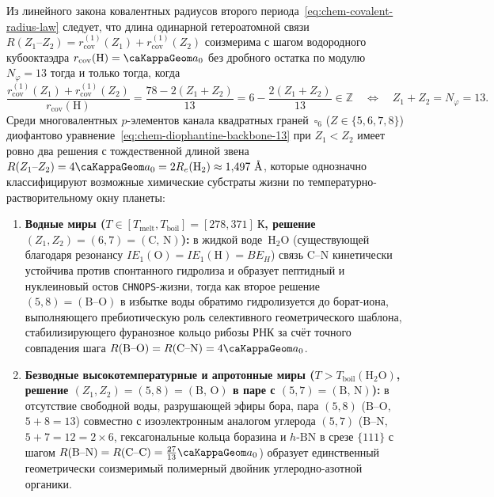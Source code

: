 \begin{corollary}[Диофантов отбор соизмеримых полимерных хребтов ($Z_1 + Z_2 = N_\varphi = 13$) и два планетарных класса биосфер]
\label{cor:chem-diophantine-backbones-planets}
Из линейного закона ковалентных радиусов второго периода~\eqref{eq:chem-covalent-radius-law} следует, что длина одинарной гетероатомной связи $R(Z_1\text{--}Z_2) = r_{\mathrm{cov}}^{(1)}(Z_1) + r_{\mathrm{cov}}^{(1)}(Z_2)$ соизмерима с шагом водородного кубооктаэдра $r_{\mathrm{cov}}(\text{H}) = \caKappaGeom a_0$ без дробного остатка по модулю $N_\varphi = 13$ тогда и только тогда, когда
\begin{equation}
\label{eq:chem-diophantine-backbone-13}
  \frac{r_{\mathrm{cov}}^{(1)}(Z_1) + r_{\mathrm{cov}}^{(1)}(Z_2)}{r_{\mathrm{cov}}(\text{H})}
  = \frac{78 - 2(Z_1 + Z_2)}{13}
  = 6 - \frac{2(Z_1 + Z_2)}{13} \in \mathbb{Z}
  \quad\Longleftrightarrow\quad
  Z_1 + Z_2 = N_\varphi = 13.
\end{equation}
Среди многовалентных $p$-элементов канала квадратных граней~$\square_6$ ($Z\in\{5,6,7,8\}$) диофантово уравнение~\eqref{eq:chem-diophantine-backbone-13} при $Z_1 < Z_2$ имеет ровно два решения с тождественной длиной звена $R(Z_1\text{--}Z_2) = 4\caKappaGeom a_0 = 2R_e(\text{H}_2) \approx 1{,}497\ \text{\normalfont\AA}$, которые однозначно классифицируют возможные химические субстраты жизни по температурно-растворительному окну планеты:
\begin{enumerate}[leftmargin=*,noitemsep]
\item \textbf{Водные миры ($T \in [T_{\mathrm{melt}}, T_{\mathrm{boil}}] = [278, 371]\ \mathrm{К}$, решение $(Z_1, Z_2) = (6, 7) = (\text{C, N})$):}
  в жидкой воде~$\text{H}_2\text{O}$ (существующей благодаря резонансу $IE_1(\text{O}) = IE_1(\text{H}) = BE_H$) связь $\text{C--N}$ кинетически устойчива против спонтанного гидролиза и образует пептидный и нуклеиновый остов \texttt{CHNOPS}-жизни, тогда как второе решение $(5, 8) = (\text{B--O})$ в избытке воды обратимо гидролизуется до борат-иона, выполняющего пребиотическую роль селективного геометрического шаблона, стабилизирующего фуранозное кольцо рибозы РНК за счёт точного совпадения шага $R(\text{B--O}) = R(\text{C--N}) = 4\caKappaGeom a_0$.
\item \textbf{Безводные высокотемпературные и апротонные миры ($T > T_{\mathrm{boil}}(\text{H}_2\text{O})$, решение $(Z_1, Z_2) = (5, 8) = (\text{B, O})$ в паре с $(5, 7) = (\text{B, N})$):}
  в отсутствие свободной воды, разрушающей эфиры бора, пара $(5, 8)$ ($\text{B--O}$, $5+8=13$) совместно с изоэлектронным аналогом углерода $(5, 7)$ ($\text{B--N}$, $5+7=12=2\times 6$, гексагональные кольца боразина и $h\text{-BN}$ в срезе $\{111\}$ с шагом $R(\text{B--N}) = R(\text{C--C}) = \frac{27}{13}\caKappaGeom a_0$) образует единственный геометрически соизмеримый полимерный двойник углеродно-азотной органики.

\end{enumerate}
\end{corollary}
